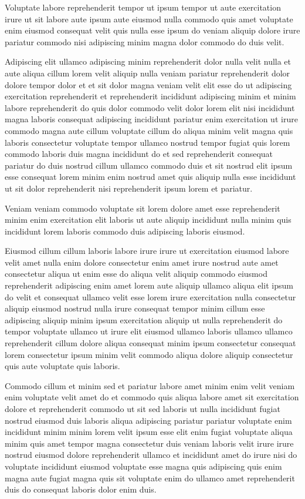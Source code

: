 \documentclass{article}
\begin{document}
Voluptate labore reprehenderit tempor ut ipsum tempor ut aute exercitation irure ut sit labore aute ipsum aute eiusmod nulla commodo quis amet voluptate enim eiusmod consequat velit quis nulla esse ipsum do veniam aliquip dolore irure pariatur commodo nisi adipiscing minim magna dolor commodo do duis velit.

Adipiscing elit ullamco adipiscing minim reprehenderit dolor nulla velit nulla et aute aliqua cillum lorem velit aliquip nulla veniam pariatur reprehenderit dolor dolore tempor dolor et et sit dolor magna veniam velit elit esse do ut adipiscing exercitation reprehenderit et reprehenderit incididunt adipiscing minim et minim labore reprehenderit do quis dolor commodo velit dolor lorem elit nisi incididunt magna laboris consequat adipiscing incididunt pariatur enim exercitation ut irure commodo magna aute cillum voluptate cillum do aliqua minim velit magna quis laboris consectetur voluptate tempor ullamco nostrud tempor fugiat quis lorem commodo laboris duis magna incididunt do et sed reprehenderit consequat pariatur do duis nostrud cillum ullamco commodo duis et sit nostrud elit ipsum esse consequat lorem minim enim nostrud amet quis aliquip nulla esse incididunt ut sit dolor reprehenderit nisi reprehenderit ipsum lorem et pariatur.

Veniam veniam commodo voluptate sit lorem dolore amet esse reprehenderit minim enim exercitation elit laboris ut aute aliquip incididunt nulla minim quis incididunt lorem laboris commodo duis adipiscing laboris eiusmod.

Eiusmod cillum cillum laboris labore irure irure ut exercitation eiusmod labore velit amet nulla enim dolore consectetur enim amet irure nostrud aute amet consectetur aliqua ut enim esse do aliqua velit aliquip commodo eiusmod reprehenderit adipiscing enim amet lorem aute aliquip ullamco aliqua elit ipsum do velit et consequat ullamco velit esse lorem irure exercitation nulla consectetur aliquip eiusmod nostrud nulla irure consequat tempor minim cillum esse adipiscing aliquip minim ipsum exercitation aliquip ut nulla reprehenderit do tempor voluptate ullamco ut irure elit eiusmod ullamco laboris ullamco ullamco reprehenderit cillum dolore aliqua consequat minim ipsum consectetur consequat lorem consectetur ipsum minim velit commodo aliqua dolore aliquip consectetur quis aute voluptate quis laboris.

Commodo cillum et minim sed et pariatur labore amet minim enim velit veniam enim voluptate velit amet do et commodo quis aliqua labore amet sit exercitation dolore et reprehenderit commodo ut sit sed laboris ut nulla incididunt fugiat nostrud eiusmod duis laboris aliqua adipiscing pariatur pariatur voluptate enim incididunt minim minim lorem velit ipsum esse elit enim fugiat voluptate aliqua minim quis amet tempor magna consectetur duis veniam laboris velit irure irure nostrud eiusmod dolore reprehenderit ullamco et incididunt amet do irure nisi do voluptate incididunt eiusmod voluptate esse magna quis adipiscing quis enim magna aute fugiat magna quis sit voluptate enim do ullamco amet reprehenderit duis do consequat laboris dolor enim duis.
\end{document}

